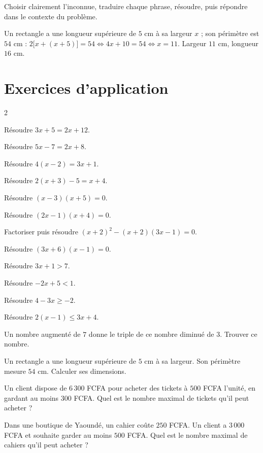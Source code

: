 Choisir clairement l'inconnue, traduire chaque phrase, résoudre, puis répondre dans le
contexte du problème.
\begin{exemple}
Un rectangle a une longueur supérieure de $5$ cm à sa largeur $x$ ; son périmètre est $54$
cm : $2\big[x+(x+5)\big]=54 \iff 4x+10=54 \iff x=11$. Largeur $11$ cm, longueur $16$ cm.
\end{exemple}

\section{Exercices d'application}
\begin{multicols}{2}

\exo{} Résoudre $3x+5=2x+12$.

\exo{} Résoudre $5x-7=2x+8$.

\exo{} Résoudre $4(x-2)=3x+1$.

\exo{} Résoudre $2(x+3)-5=x+4$.

\exo{} Résoudre $(x-3)(x+5)=0$.

\exo{} Résoudre $(2x-1)(x+4)=0$.

\exo{} Factoriser puis résoudre $(x+2)^{2}-(x+2)(3x-1)=0$.

\exo{} Résoudre $(3x+6)(x-1)=0$.

\exo{} Résoudre $3x+1>7$.

\exo{} Résoudre $-2x+5<1$.

\exo{} Résoudre $4-3x\ge-2$.

\exo{} Résoudre $2(x-1)\le3x+4$.

\exo{} Un nombre augmenté de $7$ donne le triple de ce nombre diminué de $3$.
Trouver ce nombre.

\exo{} Un rectangle a une longueur supérieure de $5$ cm à sa largeur. Son périmètre
mesure $54$ cm. Calculer ses dimensions.

\exo{} Un client dispose de $6\,300$ FCFA pour acheter des tickets à $500$ FCFA
l'unité, en gardant au moins $300$ FCFA. Quel est le nombre maximal de tickets qu'il peut
acheter ?

\exo{} Dans une boutique de Yaoundé, un cahier coûte $250$ FCFA. Un client a
$3\,000$ FCFA et souhaite garder au moins $500$ FCFA. Quel est le nombre maximal de cahiers
qu'il peut acheter ?

\end{multicols}

